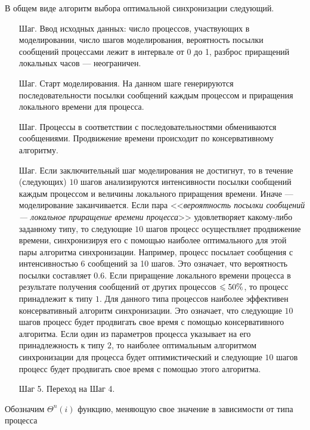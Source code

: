 В общем виде алгоритм выбора оптимальной синхронизации следующий.
\begin{itemize}


\item[Шаг\;1.] Ввод исходных данных: число процессов, участвующих в моделировании, число шагов моделирования, вероятность посылки сообщений процессами лежит в интервале от 0 до 1, разброс приращений локальных часов --- неограничен.

\item[Шаг\;2.] Старт моделирования. На данном шаге генерируются последовательности посылки сообщений каждым процессом и приращения локального времени для процесса. 

\item[Шаг\;3.] Процессы в соответствии с последовательностями обмениваются сообщениями. Продвижение времени происходит по консервативному алгоритму.

\item[Шаг\;4.] Если заключительный шаг моделирования не достигнут, то в течение (следующих) $10$ шагов анализируются интенсивности посылки сообщений каждым процессом и величины локального приращения времени. Иначе --- моделирование заканчивается. Если пара <<\textit{вероятность посылки сообщений --- локальное приращение времени процесса}>> удовлетворяет какому-либо заданному типу, то следующие $10$ шагов процесс осуществляет продвижение времени, синхронизируя его с помощью наиболее оптимального для этой пары алгоритма синхронизации. Например, процесс посылает сообщения с интенсивностью 6 сообщений за 10 шагов. Это означает, что вероятность посылки составляет $0.6$. Если приращение локального времени процесса в результате получения сообщений от других процессов \hbox{$\leqslant \hss 50\%$}, то процесс принадлежит к типу $1$. Для данного типа процессов наиболее эффективен консервативный алгоритм синхронизации. Это означает, что следующие $10$ шагов процесс будет продвигать свое время с помощью консервативного алгоритма. Если один из параметров процесса указывает на его принадлежность к типу $2$, то наиболее оптимальным алгоритмом синхронизации для процесса будет оптимистический и следующие $10$ шагов процесс будет продвигать свое время с помощью этого алгоритма.

\item[Шаг 5.] Переход на Шаг 4.

\end{itemize}

Обозначим $\Theta^n(i)$ функцию, меняющую свое значение в зависимости от типа процесса

